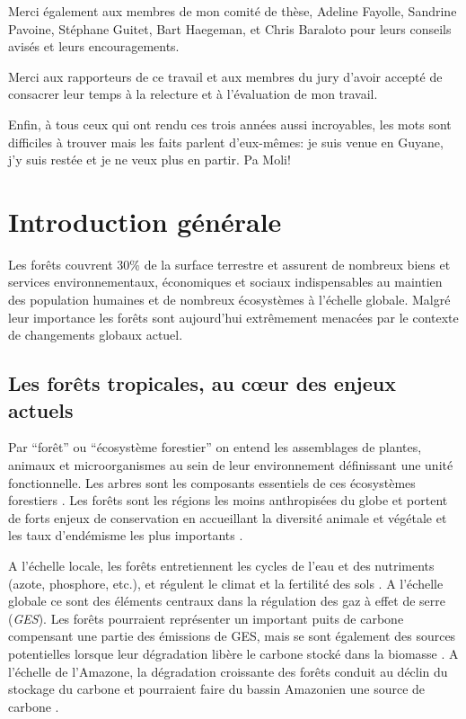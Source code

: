 \documentclass[
  11pt,
  french,
  A4paper,
  extrafontsizes,onecolumn,openright
  ]{memoir}
\begin{document}
Merci également aux membres de mon comité de thèse, Adeline Fayolle,
Sandrine Pavoine, Stéphane Guitet, Bart Haegeman, et Chris Baraloto pour
leurs conseils avisés et leurs encouragements.

Merci aux rapporteurs de ce travail et aux membres du jury d'avoir
accepté de consacrer leur temps à la relecture et à l'évaluation de mon
travail.

Enfin, à tous ceux qui ont rendu ces trois années aussi incroyables, les
mots sont difficiles à trouver mais les faits parlent d'eux-mêmes: je
suis venue en Guyane, j'y suis restée et je ne veux plus en partir. Pa
Moli!

\chapter{Introduction générale}\label{introduction-generale}

Les forêts couvrent 30\% de la surface terrestre et assurent de nombreux
biens et services environnementaux, économiques et sociaux
indispensables au maintien des population humaines et de nombreux
écosystèmes à l'échelle globale. Malgré leur importance les forêts sont
aujourd'hui extrêmement menacées par le contexte de changements globaux
actuel.

\section{Les forêts tropicales, au cœur des enjeux
actuels}\label{les-forets-tropicales-au-cur-des-enjeux-actuels}

Par ``forêt'' ou ``écosystème forestier'' on entend les assemblages de
plantes, animaux et microorganismes au sein de leur environnement
définissant une unité fonctionnelle. Les arbres sont les composants
essentiels de ces écosystèmes forestiers \autocite{FRA2000}. Les forêts
sont les régions les moins anthropisées du globe et portent de forts
enjeux de conservation en accueillant la diversité animale et végétale
et les taux d'endémisme les plus importants
\autocites{Myers2000}{Mittermeier2003}.

A l'échelle locale, les forêts entretiennent les cycles de l'eau et des
nutriments (azote, phosphore, etc.), et régulent le climat et la
fertilité des sols \autocites{Malhi2008}{Isbell2017}. A l'échelle
globale ce sont des éléments centraux dans la régulation des gaz à effet
de serre (\emph{GES}). Les forêts pourraient représenter un important
puits de carbone compensant une partie des émissions de GES, mais se
sont également des sources potentielles lorsque leur dégradation libère
le carbone stocké dans la biomasse \autocites{Pan2011}{Roy2017}. A
l'échelle de l'Amazone, la dégradation croissante des forêts conduit au
déclin du stockage du carbone et pourraient faire du bassin Amazonien
une source de carbone \autocite{Brienen2015}.
\end{document}
